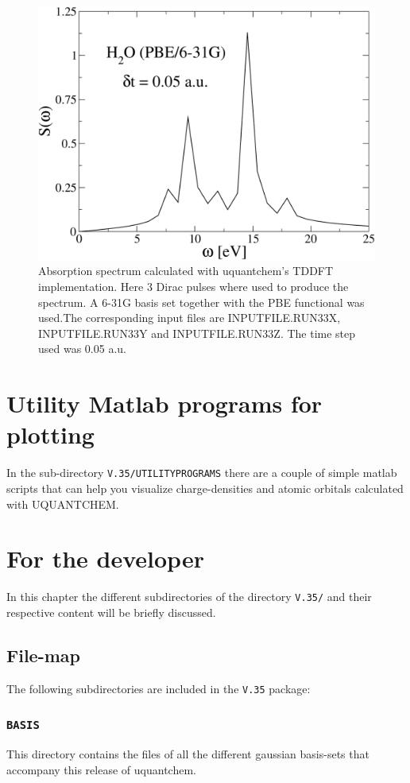 \documentclass[a4paper,twoside,openany]{book}
\begin{document}
{{\begin{figure}[tbp]
\includegraphics*[angle=0,scale=0.5]{TDFT}
\caption{\label{Figure_3}\small
Absorption spectrum calculated with uquantchem's TDDFT  implementation. Here 3 Dirac pulses where used to produce the spectrum. A 6-31G  basis  set 
together with the PBE functional was used.The corresponding input files 
are INPUTFILE.RUN33X, INPUTFILE.RUN33Y and INPUTFILE.RUN33Z.  The time step used was 0.05 a.u.}
\end{figure}

\chapter{Utility Matlab programs for plotting}
In the sub-directory \texttt{V.35/UTILITYPROGRAMS} there are a couple of simple matlab scripts that can help you visualize  charge-densities and atomic orbitals 
calculated with UQUANTCHEM. 
%
\chapter{For the developer}
In this chapter the different subdirectories of the directory \texttt{V.35/} and their respective content will be briefly discussed.
\section{File-map}
The following subdirectories are included in the \texttt{V.35} package:
\subsection{\texttt{BASIS}}
This directory contains the files of all the different gaussian basis-sets that accompany this release of uquantchem. 
}}
\end{document}
